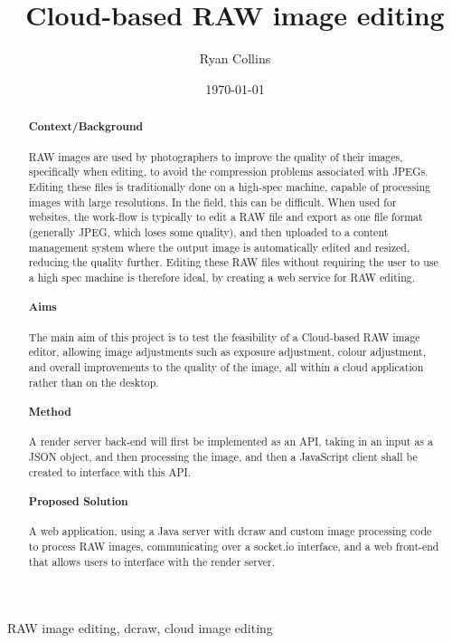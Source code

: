 \documentclass[12pt,a4paper]{article}
\title{Cloud-based RAW image editing}
\author{Ryan Collins}
\date{\today}
\begin{document}
\maketitle

\begin{abstract}
\paragraph{Context/Background}
RAW images are used by photographers to improve the quality of their images, specifically
when editing, to avoid the compression problems associated with JPEGs. Editing these
files is traditionally done on a high-spec machine, capable of processing images with large
resolutions. In the field, this can be difficult. When used for websites, the work-flow is typically
to edit a RAW file and export as one file format (generally JPEG, which loses some quality), and then uploaded to a content management system where
the output image is automatically edited and resized, reducing the quality further. Editing these RAW files without requiring the user to use a high spec
machine is therefore ideal, by creating a web service for RAW editing.
\paragraph{Aims}
The main aim of this project is to test the feasibility of a Cloud-based RAW image
editor, allowing image adjustments such as exposure adjustment, colour adjustment,
and overall improvements to the quality of the image, all within a cloud application
rather than on the desktop.
\paragraph{Method}
A render server back-end will first be implemented as an API, taking in an input as a
JSON object, and then processing the image, and then a JavaScript
client shall be created to interface with this API.
\paragraph{Proposed Solution}
A web application, using a Java server with dcraw and custom image processing code to
process RAW images, communicating over a socket.io interface, and a web front-end that allows
users to interface with the render server.
\end{abstract}

\begin{keywords}
RAW image editing, dcraw, cloud image editing
\end{keywords}
\end{document}
